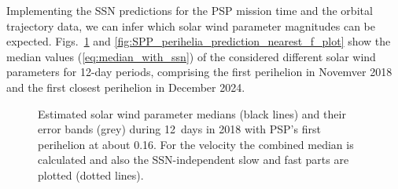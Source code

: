 \documentclass[]{aa}
\begin{document}
	Implementing the SSN predictions for the PSP mission time and the orbital trajectory data, we can infer which solar wind parameter magnitudes can be expected. Figs.~\ref{fig:SPP_perihelia_prediction_f_plot} and \ref{fig:SPP_perihelia_prediction_nearest_f_plot} show the median values (\ref{eq:median_with_ssn}) of the considered different solar wind parameters for 12-day periods, comprising the first perihelion in Novemver 2018 and the first closest perihelion in December 2024.
	\begin{figure}
		\caption{Estimated solar wind parameter medians (black lines) and their error bands (grey) during 12~days in 2018 with PSP's first perihelion at about \SI{0.16}{\au}. For the velocity the combined median is calculated and also the SSN-independent slow and fast parts are plotted (dotted lines).}
		\label{fig:SPP_perihelia_prediction_f_plot}
	\end{figure}
\end{document}
